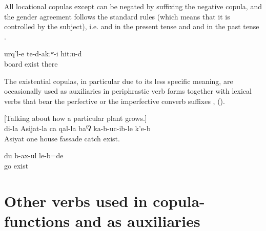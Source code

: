 All locational copulas except  can be negated by suffixing the negative copula, and the gender agreement follows the standard rules (which means that it is controlled by the subject), i.e.  and   in the present tense and  and  in the past tense .
%
\begin{exe}
	\ex	\label{ex:There were no boards there}
	\gll	urq'l-e	te-d-akːʷ-i	hitːu-d\\
		board	exist	there\\
	\glt	{}
\end{exe}

The existential copulas, in particular  due to its less specific meaning, are occasionally used as auxiliaries in periphrastic verb forms together with lexical verbs that bear the perfective or the imperfective converb suffixes ,  ().
%
\begin{exe}
	\ex	\label{ex:[Talking about how a particular plant grows.] ‎‎[It can become large], at my Asjiat's place it covered one wall of the house}
	[Talking about how a particular plant grows.]\\
	\gll	di-la	Asijat-la	ca	qal-la	baˁʡ	ka-b-uc-ib-le	k'e-b\\
			Asiyat	one	house	fassade	catch	exist.\\
	\glt	{}

	\ex	\label{ex:[at the time when the fox was born], I went run around (said the wolf)}
	\gll	du	b-ax-ul	le-b=de\\
			go	exist\\
	\glt	{}
\end{exe}



\section{Other verbs used in copula-functions and as auxiliaries}
\label{sec:Other verbs used in copula-functions and as auxiliaries}

